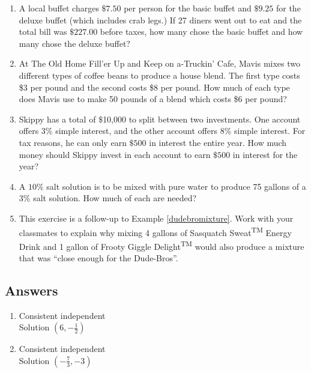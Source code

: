 \documentclass{ximera}
\begin{document}
\begin{enumerate}
\setcounter{enumi}{\value{HW}}

\item  A local buffet charges $\$7.50$ per person for the basic buffet and $\$9.25$ for the deluxe buffet (which includes crab legs.)  If 27 diners went out to eat and the total bill was $\$227.00$ before taxes, how many chose the basic buffet and how many chose the deluxe buffet?

\item At The Old Home Fill'er Up and Keep on a-Truckin' Cafe, Mavis mixes two different types of coffee beans to produce a house blend.   The first type costs \$3 per pound and the second costs \$8 per pound.  How much of each type does Mavis use to make 50 pounds of a blend which costs \$6 per pound?

\item  Skippy has a total of $\$$10,000 to split between two investments.  One account offers $3\%$ simple interest, and the other account offers $8\%$ simple interest.  For tax reasons, he can only earn $\$500$ in interest the entire year.  How much money should Skippy invest in each account to earn $\$500$ in interest for the year?

\item A $10 \%$ salt solution is to be mixed with pure water to produce 75 gallons of a $3\%$ salt solution.  How much of each are needed?

\item This exercise is a follow-up to Example \ref{dudebromixture}.  Work with your classmates to explain why mixing 4 gallons of Sasquatch Sweat\textsuperscript{TM} Energy Drink and 1 gallon of Frooty Giggle Delight\textsuperscript{TM} would also produce a mixture that was ``close enough for the Dude-Bros''.

\end{enumerate}

\newpage

\subsection{Answers}

\begin{multicols}{2}
\begin{enumerate}

\item Consistent independent \\
Solution $\left(6, -\frac{1}{2}\right)$

\item Consistent independent \\
Solution $\left(-\frac{7}{3}, -3\right)$ 


\setcounter{HW}{\value{enumi}}
\end{enumerate}
\end{multicols}
\end{document}
